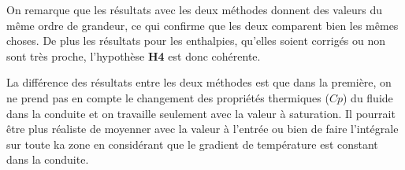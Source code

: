 On remarque que les résultats avec les deux méthodes donnent des valeurs du même ordre de grandeur, ce qui confirme que les deux comparent bien les mêmes choses. De plus les résultats pour les enthalpies, qu'elles soient corrigés ou non sont très proche, l'hypothèse \textbf{H4} est donc cohérente.\\ \par
La différence des résultats entre les deux méthodes est que dans la première, on ne prend pas en compte le changement des propriétés thermiques ($Cp$) du fluide dans la conduite et on travaille seulement avec la valeur à saturation. Il pourrait être plus réaliste de moyenner avec la valeur à l'entrée ou bien de faire l'intégrale sur toute ka zone en considérant que le gradient de température est constant dans la conduite.
